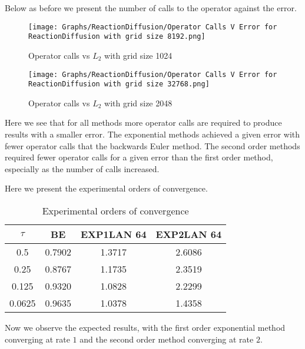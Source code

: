 Below as before we present the number of calls to the operator against the error.
\begin{figure}[H]
    \centering
    \begin{minipage}{0.49\textwidth}
        \texttt{[image: Graphs/ReactionDiffusion/Operator Calls V Error for ReactionDiffusion with grid size 8192.png]} %
        \caption{Operator calls vs $L_2$ with grid size 1024}
        \label{fig:plot1}
    \end{minipage}\hfill
    \centering
    \begin{minipage}{0.49\textwidth}
        \texttt{[image: Graphs/ReactionDiffusion/Operator Calls V Error for ReactionDiffusion with grid size 32768.png]} %
        \caption{Operator calls vs $L_2$ with grid size 2048}
        \label{fig:plot2}
    \end{minipage}\hfill
\end{figure}
Here we see that for all methods more operator calls are required to produce results with a smaller error.
The exponential methods achieved a given error with fewer operator calls that the backwards Euler method.
The second order methods required fewer operator calls for a given error than the first order method, especially as the number of calls increased.


Here we present the experimental orders of convergence.
\begin{table}[H]
    \centering
    \begin{tabular}{| c | c | c | c |}
    \hline
    $\tau$ & BE & EXP1LAN 64 & EXP2LAN 64 \\
    \hline
    0.5 & 0.7902 & 1.3717 & 2.6086 \\
    0.25 & 0.8767 & 1.1735 & 2.3519 \\
    0.125 & 0.9320 & 1.0828 & 2.2299\\
    0.0625 & 0.9635  & 1.0378 & 1.4358 \\
    \hline
    \end{tabular}
    \caption{Experimental orders of convergence}
    \label{tab:reduced_data}
\end{table}

Now we observe the expected results, with the first order exponential method converging at rate $1$ and the second order method converging at rate $2$.